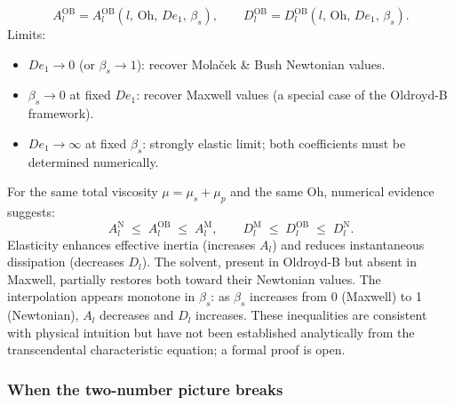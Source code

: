 \begin{keybox}
\begin{equation}
  A_l^{\mathrm{OB}} = A_l^{\mathrm{OB}}(l,\,\mathrm{Oh},\,De_1,\,\beta_s),
  \qquad
  D_l^{\mathrm{OB}} = D_l^{\mathrm{OB}}(l,\,\mathrm{Oh},\,De_1,\,\beta_s).
\end{equation}
Limits:
\begin{itemize}
  \item $De_1 \to 0$ (or $\beta_s \to 1$): recover Mola\v{c}ek \& Bush
        Newtonian values.
  \item $\beta_s \to 0$ at fixed $De_1$: recover Maxwell values (a special
        case of the Oldroyd-B framework).
  \item $De_1 \to \infty$ at fixed $\beta_s$: strongly elastic limit; both
        coefficients must be determined numerically.
\end{itemize}
\end{keybox}

\begin{notebox}
For the same total viscosity $\mu = \mu_s + \mu_p$ and the same Oh,
numerical evidence suggests:
\[
  A_l^{\mathrm{N}} \;\leq\; A_l^{\mathrm{OB}} \;\leq\; A_l^{\mathrm{M}},
  \qquad
  D_l^{\mathrm{M}} \;\leq\; D_l^{\mathrm{OB}} \;\leq\; D_l^{\mathrm{N}}.
\]
Elasticity enhances effective inertia (increases $A_l$) and reduces
instantaneous dissipation (decreases $D_l$). The solvent, present in
Oldroyd-B but absent in Maxwell, partially restores both toward their
Newtonian values. The interpolation appears monotone in $\beta_s$: as
$\beta_s$ increases from 0 (Maxwell) to 1 (Newtonian), $A_l$ decreases
and $D_l$ increases. These inequalities are consistent with physical
intuition but have not been established analytically from the
transcendental characteristic equation; a formal proof is open.
\end{notebox}

\subsubsection{When the two-number picture breaks}

